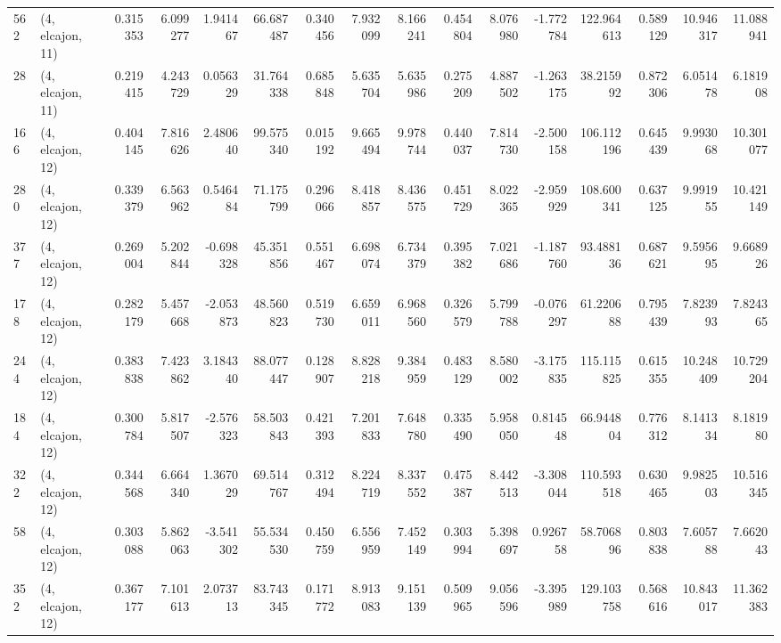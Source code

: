 \begin{tabular}{llrrrrrrrrrrrrrr}
562 &  (4, elcajon, 11) &   0.315353 &   6.099277 &   1.941467 &    66.687487 &   0.340456 &   7.932099 &   8.166241 &  0.454804 &   8.076980 &  -1.772784 &   122.964613 &  0.589129 &  10.946317 &  11.088941 \\
28  &  (4, elcajon, 11) &   0.219415 &   4.243729 &   0.056329 &    31.764338 &   0.685848 &   5.635704 &   5.635986 &  0.275209 &   4.887502 &  -1.263175 &    38.215992 &  0.872306 &   6.051478 &   6.181908 \\
166 &  (4, elcajon, 12) &   0.404145 &   7.816626 &   2.480640 &    99.575340 &   0.015192 &   9.665494 &   9.978744 &  0.440037 &   7.814730 &  -2.500158 &   106.112196 &  0.645439 &   9.993068 &  10.301077 \\
280 &  (4, elcajon, 12) &   0.339379 &   6.563962 &   0.546484 &    71.175799 &   0.296066 &   8.418857 &   8.436575 &  0.451729 &   8.022365 &  -2.959929 &   108.600341 &  0.637125 &   9.991955 &  10.421149 \\
377 &  (4, elcajon, 12) &   0.269004 &   5.202844 &  -0.698328 &    45.351856 &   0.551467 &   6.698074 &   6.734379 &  0.395382 &   7.021686 &  -1.187760 &    93.488136 &  0.687621 &   9.595695 &   9.668926 \\
178 &  (4, elcajon, 12) &   0.282179 &   5.457668 &  -2.053873 &    48.560823 &   0.519730 &   6.659011 &   6.968560 &  0.326579 &   5.799788 &  -0.076297 &    61.220688 &  0.795439 &   7.823993 &   7.824365 \\
244 &  (4, elcajon, 12) &   0.383838 &   7.423862 &   3.184340 &    88.077447 &   0.128907 &   8.828218 &   9.384959 &  0.483129 &   8.580002 &  -3.175835 &   115.115825 &  0.615355 &  10.248409 &  10.729204 \\
184 &  (4, elcajon, 12) &   0.300784 &   5.817507 &  -2.576323 &    58.503843 &   0.421393 &   7.201833 &   7.648780 &  0.335490 &   5.958050 &   0.814548 &    66.944804 &  0.776312 &   8.141334 &   8.181980 \\
322 &  (4, elcajon, 12) &   0.344568 &   6.664340 &   1.367029 &    69.514767 &   0.312494 &   8.224719 &   8.337552 &  0.475387 &   8.442513 &  -3.308044 &   110.593518 &  0.630465 &   9.982503 &  10.516345 \\
58  &  (4, elcajon, 12) &   0.303088 &   5.862063 &  -3.541302 &    55.534530 &   0.450759 &   6.556959 &   7.452149 &  0.303994 &   5.398697 &   0.926758 &    58.706896 &  0.803838 &   7.605788 &   7.662043 \\
352 &  (4, elcajon, 12) &   0.367177 &   7.101613 &   2.073713 &    83.743345 &   0.171772 &   8.913083 &   9.151139 &  0.509965 &   9.056596 &  -3.395989 &   129.103758 &  0.568616 &  10.843017 &  11.362383 \\

\end{tabular}
